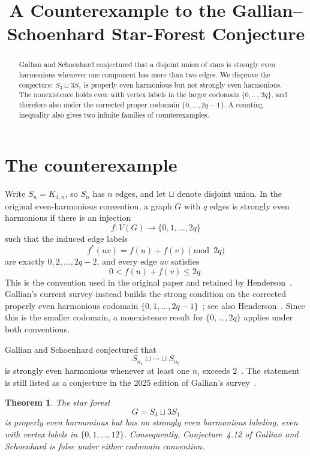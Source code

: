 \documentclass[11pt]{amsart}
\title[A counterexample to the Gallian--Schoenhard conjecture]
{A Counterexample to the Gallian--Schoenhard Star-Forest Conjecture}
\date{}
\newtheorem{theorem}{Theorem}
\theoremstyle{remark}
\begin{document}
\begin{abstract}
Gallian and Schoenhard conjectured that a disjoint union of stars is
strongly even harmonious whenever one component has more than two
edges. We disprove the conjecture: $S_3\sqcup 3S_1$ is properly even
harmonious but not strongly even harmonious. The nonexistence holds
even with vertex labels in the larger codomain $\{0,\ldots,2q\}$, and
therefore also under the corrected proper codomain
$\{0,\ldots,2q-1\}$. A counting inequality also gives two infinite
families of counterexamples.
\end{abstract}

\maketitle

\section{The counterexample}

Write $S_n=K_{1,n}$, so $S_n$ has $n$ edges, and let $\sqcup$ denote
disjoint union. In the original even-harmonious convention, a graph
$G$ with $q$ edges is strongly even harmonious if there is an
injection
\[
 f:V(G)\longrightarrow \{0,1,\ldots,2q\}
\]
such that the induced edge labels
\[
 f^*(uv)=f(u)+f(v)\pmod{2q}
\]
are exactly $0,2,\ldots,2q-2$, and every edge $uv$ satisfies
\[
 0<f(u)+f(v)\le 2q.
\]
This is the convention used in the original paper and retained by
Henderson~\cite{GallianSchoenhard,Henderson}. Gallian's current survey
instead builds the strong condition on the corrected properly even
harmonious codomain
$\{0,1,\ldots,2q-1\}$~\cite[Section~4.6]{Gallian}; see also
Henderson~\cite{Henderson}. Since this is the smaller codomain, a
nonexistence result for $\{0,\ldots,2q\}$ applies under both
conventions.

Gallian and Schoenhard conjectured that
\[
 S_{n_1}\sqcup\cdots\sqcup S_{n_t}
\]
is strongly even harmonious whenever at least one $n_i$ exceeds
$2$~\cite[Conjecture~4.12]{GallianSchoenhard}. The statement is still
listed as a conjecture in the 2025 edition of Gallian's
survey~\cite[Section~4.6, p.~142]{Gallian}.

\begin{theorem}\label{thm:main}
The star forest
\[
 G=S_3\sqcup 3S_1
\]
is properly even harmonious but has no strongly even harmonious
labeling, even with vertex labels in $\{0,1,\ldots,12\}$. Consequently,
Conjecture~4.12 of Gallian and Schoenhard is false under either
codomain convention.
\end{theorem}
\end{document}
